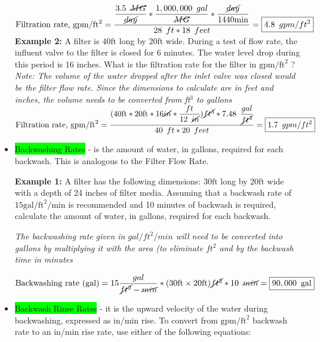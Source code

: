 \begin{itemize}
$\text{Filtration rate, } \mathrm{gpm} / \mathrm{ft}^{2} = 
\dfrac{
\dfrac{3.5 \enspace \cancel{MG}}{ \cancel{day}} * \dfrac{1,000,000 \enspace gal}{\cancel{MG}}
*\dfrac{\cancel{day}}{1440 \mathrm{ min}}}
{28 \enspace ft * 18 \enspace feet}= \boxed{4.8 \enspace gpm/ft^2}$\\
\vspace{0.2cm}
\textbf{Example 2:} A filter is $40 \mathrm{ft}$ long by $20 \mathrm{ft}$ wide. During a test of flow rate, the influent valve to the filter is closed for 6 minutes. The water level drop during this period is 16 inches. What is the filtration rate for the filter in $\mathrm{gpm} / \mathrm{ft}^{2}$ ?\\
\vspace{0.2cm}
\textit{Note:  The volume of the water dropped after the inlet valve was closed would be the filter flow rate.  Since the dimensions to calculate are in feet and inches, the volume needs to be converted from ft$^3$ to gallons}\\
\vspace{0.2cm}
$\text{Filtration rate, } \mathrm{gpm} / \mathrm{ft}^{2} = 
\dfrac{(
40 \mathrm{ ft}*20 \mathrm{ ft} * 16 \mathrm{\cancel{in}}*
\dfrac{ft}{12 \enspace \cancel{in}}
)
\cancel{ft^3}*7.48 \enspace 
\dfrac
{gal}
{\cancel{ft^3}}}
{40 \enspace ft * 20 \enspace feet}= \boxed{1.7\enspace gpm/ft^2}$\\

\item \colorbox{lime}{Backwashing Rates} - is the amount of water, in gallons, required for each backwash. This is analogous to the Filter Flow Rate.

\textbf{Example 1:}
A filter has the following dimensions: $30 \mathrm{ft}$ long by $20 \mathrm{ft}$ wide with a depth of 24 inches of filter media. Assuming that a backwash rate of $15 \mathrm{gal} / \mathrm{ft}^{2} / \mathrm{min}$ is recommended and 10 minutes of backwash is required, calculate the amount of water, in gallons, required for each backwash.

\textit{The backwashing rate given in $gal/ft^2/min$ will need to be converted into gallons by multiplying it with the area (to eliminate $ft^2$ and by the backwash time in minutes}

$ \text{Backwashing rate (gal)} = 15\dfrac{gal}{\cancel{ft^2}-\cancel{min}}*(30 \mathrm{ ft} \times 20 \mathrm{ ft})\cancel{ft^2}*10 \enspace \cancel{min}=\boxed{90,000 \enspace \text{gal}}$

\item \colorbox{lime}{Backwash Rinse Rates} - it is the upward velocity of the water during backwashing, expressed as in/min rise. To convert from $\mathrm{gpm} / \mathrm{ft}^{2}$ backwash rate to an in/min rise rate, use either of the following equations:


\end{itemize}

